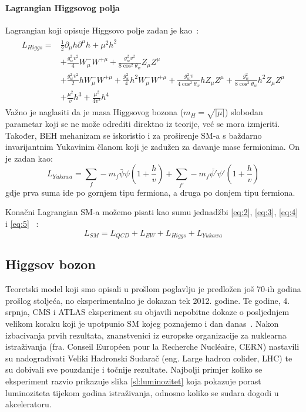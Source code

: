 \documentclass[12pt,a4paper,oneside]{article}
\begin{document}
\begin{linenumbers}
		\paragraph{Lagrangian Higgsovog polja\newline}
		Lagrangian koji opisuje Higgsovo polje zadan je kao~\cite{doktorat}:
		\begin{align}\label{eq:4}
		\begin{split}
		L_{Higgs} ={}& \frac{1}{2} \partial_\mu h \partial^\mu h + \mu^2 h^2 \\ &+ \frac{g_w^2 v^2}{4} {W_{\mu}^{-}} {W^{+\mu}} + \frac{g^2_w v^2}{8 \cos^2 \theta_w} Z_\mu Z^\mu \\ &+ \frac{g^2_w v^2}{2} h {W_{\mu}^{-}} {W^{+\mu}} + \frac{g^2_w }{4} h^2 {W_{\mu}^{-}} {W^{+\mu}} + \frac{g^2_w v}{4 \cos^2 \theta_w} h {Z}_\mu {Z^{\mu}} + \frac{g^2_w}{8 \cos^2 \theta_w} h^2 {Z}_\mu {Z^{\mu}} \\ &+ \frac{\mu^2}{v} h^3 + \frac{\mu^2}{4v^2} h^4
		\end{split}
		\end{align}
		Važno je naglasiti da je masa Higgsovog bozona (\begin{math}
		m_H = \sqrt{|\mu|}
		\end{math})  slobodan parametar koji se ne može odrediti direktno iz teorije, već se mora izmjeriti.
		Također, BEH mehanizam se iskoristio i za proširenje SM-a s baždarno invarijantnim Yukavinim članom koji je zadužen za davanje mase fermionima. On je zadan kao:
		\begin{equation}\label{eq:5}
			L_{Yukawa} = \sum_{f} -m_f \bar{\psi} \psi (1 + \frac{h}{v}) + \sum_{f'} -m_f \bar{\psi'} \psi' (1 + \frac{h}{v})
		\end{equation} 
		gdje prva suma ide po gornjem tipu fermiona, a druga po donjem tipu fermiona.
		
		Konačni Lagrangian SM-a možemo pisati kao sumu jednadžbi \ref{eq:2}, \ref{eq:3}, \ref{eq:4} i \ref{eq:5} ~\cite{doktorat}:
		\begin{equation}
			L_{SM} = L_{QCD} + L_{EW} + L_{Higgs} + L_{Yukawa}
		\end{equation}
		
		
		\subsection{Higgsov bozon}
		Teoretski model koji smo opisali u prošlom poglavlju  je predložen još 70-ih godina prošlog stoljeća, no eksperimentalno je dokazan tek 2012. godine. Te godine, 4. srpnja, CMS i ATLAS eksperiment su  objavili nepobitne dokaze o posljednjem velikom koraku koji je upotpunio SM kojeg poznajemo i dan danas~\cite{doktorat}. Nakon izbacivanja prvih  rezultata, znanstvenici iz europske organizacije za nuklearna istraživanja (fra. Conseil Européen pour la Recherche Nucléaire, CERN)  nastavili su nadograđivati Veliki Hadronski Sudarač (eng. Large hadron colider, LHC) te su dobivali sve pouzdanije i točnije rezultate. Najbolji primjer koliko se eksperiment razvio prikazuje slika \ref{sl:luminozitet}  koja pokazuje  porast luminoziteta  tijekom godina istraživanja, odnosno koliko se sudara dogodi u akceleratoru.
		

\end{linenumbers}
\end{document}
